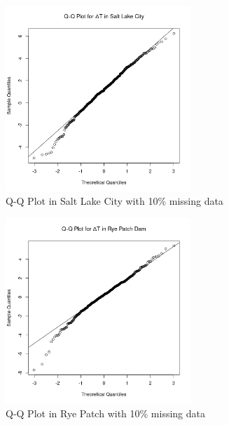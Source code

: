 \begin{figure}
  \centering
  \includegraphics[width=7cm]{../data/img/Salt_Lake_Diff_QQ_Plot_missing_data.png}
  \caption{Q-Q Plot in Salt Lake City with 10\% missing data}
  \label{fig:slc_diff_qqplot_missing}
\end{figure}

\begin{figure}
  \centering
  \includegraphics[width=7cm]{../data/img/Rye_Patch_Diff_QQ_Plot_missing_data.png}
  \caption{Q-Q Plot in Rye Patch with 10\% missing data}
  \label{fig:rp_diff_qqplot_missing}
\end{figure}